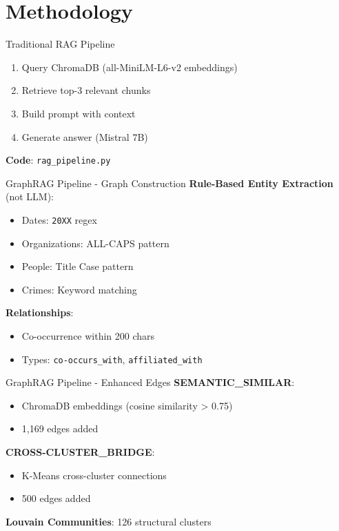 \documentclass{beamer}
\begin{document}
\section{Methodology}
\begin{frame}{Traditional RAG Pipeline}
\begin{enumerate}
\item Query ChromaDB (all-MiniLM-L6-v2 embeddings)
\item Retrieve top-3 relevant chunks
\item Build prompt with context
\item Generate answer (Mistral 7B)
\end{enumerate}
\vspace{0.3cm}
\textbf{Code}: \texttt{rag\_pipeline.py}
\end{frame}

\begin{frame}{GraphRAG Pipeline - Graph Construction}
\textbf{Rule-Based Entity Extraction} (not LLM):
\begin{itemize}
\item Dates: \texttt{20XX} regex
\item Organizations: ALL-CAPS pattern
\item People: Title Case pattern
\item Crimes: Keyword matching
\end{itemize}
\vspace{0.3cm}
\textbf{Relationships}:
\begin{itemize}
\item Co-occurrence within 200 chars
\item Types: \texttt{co-occurs\_with}, \texttt{affiliated\_with}
\end{itemize}
\end{frame}

\begin{frame}{GraphRAG Pipeline - Enhanced Edges}
\textbf{SEMANTIC\_SIMILAR}:
\begin{itemize}
\item ChromaDB embeddings (cosine similarity > 0.75)
\item 1,169 edges added
\end{itemize}
\vspace{0.3cm}
\textbf{CROSS-CLUSTER\_BRIDGE}:
\begin{itemize}
\item K-Means cross-cluster connections
\item 500 edges added
\end{itemize}
\vspace{0.3cm}
\textbf{Louvain Communities}: 126 structural clusters
\end{frame}
\end{document}
